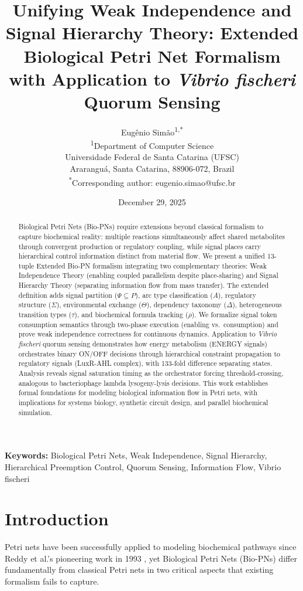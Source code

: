 \documentclass[twocolumn,11pt]{article}
\title{\textbf{Unifying Weak Independence and Signal Hierarchy Theory: Extended Biological Petri Net Formalism with Application to \textit{Vibrio fischeri} Quorum Sensing}}
\author{
Eugênio Simão\textsuperscript{1,*}\\
\textsuperscript{1}Department of Computer Science\\
Universidade Federal de Santa Catarina (UFSC)\\
Araranguá, Santa Catarina, 88906-072, Brazil\\
\textsuperscript{*}Corresponding author: eugenio.simao@ufsc.br
}
\date{December 29, 2025}
\begin{document}
\maketitle

\begin{abstract}
Biological Petri Nets (Bio-PNs) require extensions beyond classical formalism to capture biochemical reality: multiple reactions simultaneously affect shared metabolites through convergent production or regulatory coupling, while signal places carry hierarchical control information distinct from material flow. We present a unified 13-tuple Extended Bio-PN formalism integrating two complementary theories: Weak Independence Theory (enabling coupled parallelism despite place-sharing) and Signal Hierarchy Theory (separating information flow from mass transfer). The extended definition adds signal partition ($\Psi \subseteq P$), arc type classification ($A$), regulatory structure ($\Sigma$), environmental exchange ($\Theta$), dependency taxonomy ($\Delta$), heterogeneous transition types ($\tau$), and biochemical formula tracking ($\rho$). We formalize signal token consumption semantics through two-phase execution (enabling vs.\ consumption) and prove weak independence correctness for continuous dynamics. Application to \textit{Vibrio fischeri} quorum sensing demonstrates how energy metabolism (ENERGY signals) orchestrates binary ON/OFF decisions through hierarchical constraint propagation to regulatory signals (LuxR-AHL complex), with 133-fold difference separating states. Analysis reveals signal saturation timing as the orchestrator forcing threshold-crossing, analogous to bacteriophage lambda lysogeny-lysis decisions. This work establishes formal foundations for modeling biological information flow in Petri nets, with implications for systems biology, synthetic circuit design, and parallel biochemical simulation.
\end{abstract}

\textbf{Keywords:} Biological Petri Nets, Weak Independence, Signal Hierarchy, Hierarchical Preemption Control, Quorum Sensing, Information Flow, Vibrio fischeri

\section{Introduction}

Petri nets have been successfully applied to modeling biochemical pathways since Reddy et al.'s pioneering work in 1993 \cite{Reddy1993}, yet Biological Petri Nets (Bio-PNs) differ fundamentally from classical Petri nets in two critical aspects that existing formalism fails to capture.
\end{document}
